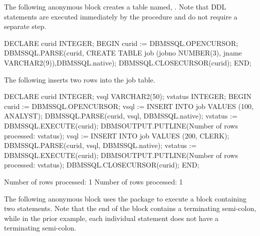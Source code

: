 \documentclass[letterpaper,10pt,english,openany,oneside]{sphinxmanual}
\begin{document}
The following anonymous block creates a table named, . Note that DDL
statements are executed immediately by the  procedure and do not
require a separate  step.

%
\begin{sphinxVerbatim}[commandchars=\\\{\}]
DECLARE
    curid           INTEGER;
BEGIN
    curid := DBMS\PYGZus{}SQL.OPEN\PYGZus{}CURSOR;
    DBMS\PYGZus{}SQL.PARSE(curid, \PYGZsq{}CREATE TABLE job (jobno NUMBER(3), \PYGZsq{} \textbar{}\textbar{}
        \PYGZsq{}jname VARCHAR2(9))\PYGZsq{},DBMS\PYGZus{}SQL.native);
    DBMS\PYGZus{}SQL.CLOSE\PYGZus{}CURSOR(curid);
END;
\end{sphinxVerbatim}

The following inserts two rows into the job table.

%
\begin{sphinxVerbatim}[commandchars=\\\{\}]
DECLARE
    curid           INTEGER;
    v\PYGZus{}sql           VARCHAR2(50);
    v\PYGZus{}status        INTEGER;
BEGIN
    curid := DBMS\PYGZus{}SQL.OPEN\PYGZus{}CURSOR;
    v\PYGZus{}sql := \PYGZsq{}INSERT INTO job VALUES (100, \PYGZsq{}\PYGZsq{}ANALYST\PYGZsq{}\PYGZsq{})\PYGZsq{};
    DBMS\PYGZus{}SQL.PARSE(curid, v\PYGZus{}sql, DBMS\PYGZus{}SQL.native);
    v\PYGZus{}status := DBMS\PYGZus{}SQL.EXECUTE(curid);
    DBMS\PYGZus{}OUTPUT.PUT\PYGZus{}LINE(\PYGZsq{}Number of rows processed: \PYGZsq{} \textbar{}\textbar{} v\PYGZus{}status);
    v\PYGZus{}sql := \PYGZsq{}INSERT INTO job VALUES (200, \PYGZsq{}\PYGZsq{}CLERK\PYGZsq{}\PYGZsq{})\PYGZsq{};
    DBMS\PYGZus{}SQL.PARSE(curid, v\PYGZus{}sql, DBMS\PYGZus{}SQL.native);
    v\PYGZus{}status := DBMS\PYGZus{}SQL.EXECUTE(curid);
    DBMS\PYGZus{}OUTPUT.PUT\PYGZus{}LINE(\PYGZsq{}Number of rows processed: \PYGZsq{} \textbar{}\textbar{} v\PYGZus{}status);
    DBMS\PYGZus{}SQL.CLOSE\PYGZus{}CURSOR(curid);
END;

Number of rows processed: 1
Number of rows processed: 1
\end{sphinxVerbatim}

The following anonymous block uses the  package to execute a
block containing two  statements. Note that the end of the block
contains a terminating semi-colon, while in the prior example, each
individual  statement does not have a terminating semi-colon.
\end{document}
